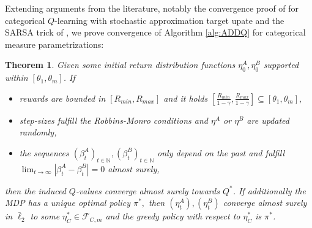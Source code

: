 \documentclass{article}
\newcommand{\cF}{\mathcal{F}}
\newcommand{\N}{\mathbb{N}}
\theoremstyle{plain}
\newtheorem{theorem}{Theorem}[section]
\theoremstyle{definition}
\theoremstyle{remark}
\begin{document}
Extending arguments from the literature, notably the convergence proof of \cite{rowland18} for categorical $Q$-learning with stochastic approximation target upate and the SARSA trick of \cite{singh2000}, we prove convergence of Algorithm \ref{alg:ADDQ} for categorical measure parametrizations:
\begin{theorem}\label{thm:double categorical control1}
    Given some initial return distribution functions $\eta_0^{A},\eta^{B}_0$ supported within $[\theta_1,\theta_m]$. If
\begin{itemize}
	\item rewards are bounded in $[R_{min},R_{max}]$ and it holds $[\frac{R_{min}}{1-\gamma},\frac{R_{max}}{1-\gamma}]\subseteq[\theta_1,\theta_m],$
    \item step-sizes fulfill the Robbins-Monro conditions and $\eta^A$ or $\eta^B$ are updated randomly,
    \item the sequences $(\beta^A_t)_{t\in\N},(\beta^B_t)_{t\in\N}$ only depend on the past and fulfill $\lim_{t\to\infty} |\beta^A_t-\beta^B_t|=0$ almost surely,
\end{itemize}
then the induced $Q$-values converge almost surely towards $Q^*$. 
If additionally the MDP has a unique optimal policy $\pi^*,$ then $(\eta_t^{A}),(\eta^{B}_t)$ converge almost surely in $\bar\ell_2$ to some  $\eta^*_C\in\cF_{C,m}$ and the greedy policy with respect to $\eta^{*}_C$ is $\pi^*$.
\end{theorem}
\end{document}
